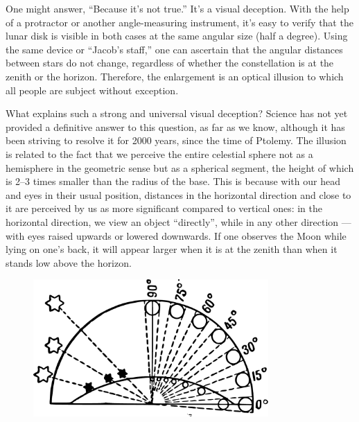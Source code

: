 One might answer, ``Because it's not true.'' It's a visual deception. With the help of a protractor or another angle-measuring instrument, it's easy to verify that the lunar disk is visible in both cases at the same angular size (half a degree). Using the same device or ``Jacob's staff,'' one can ascertain that the angular distances between stars do not change, regardless of whether the constellation is at the zenith or the horizon. Therefore, the enlargement is an optical illusion to which all people are subject without exception.

What explains such a strong and universal visual deception? Science has not yet provided a definitive answer to this question, as far as we know, although it has been striving to resolve it for 2000 years, since the time of Ptolemy. The illusion is related to the fact that we perceive the entire celestial sphere not as a hemisphere in the geometric sense but as a spherical segment, the height of which is 2–3 times smaller than the radius of the base. This is because with our head and eyes in their usual position, distances in the horizontal direction and close to it are perceived by us as more significant compared to vertical ones: in the horizontal direction, we view an object ``directly'', while in any other direction — with eyes raised upwards or lowered downwards. If one observes the Moon while lying on one's back, it will appear larger when it is at the zenith than when it stands low above the horizon.

\begin{figure}[h!]
\centering
\includegraphics[width=0.8\textwidth]{figures/ch-03/fig-075.pdf}
\end{figure}


